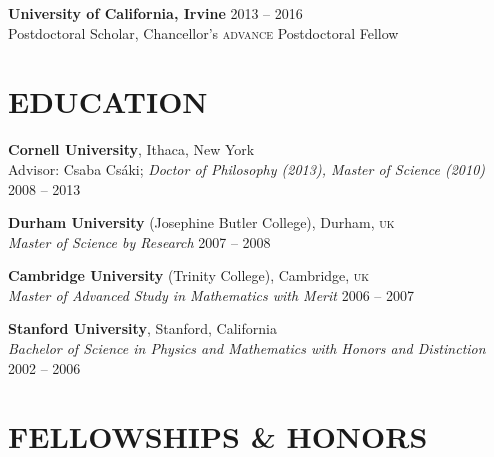 \documentclass[margin,line]{resume}
\newcommand{\scap}[1]{\textsc{\MakeLowercase{#1}}}
\begin{document}
\begin{resume}
\vspace{-3mm}


\textbf{University of California, Irvine} 
\hfill 
\textsf{ 
2013 -- 2016
}\vspace{-3mm}\\

\vspace{-6mm}
Postdoctoral Scholar, Chancellor's \textsc{advance} Postdoctoral Fellow   







\section{\footnotesize \sc
\sffamily 
{}
EDUCATION
}

\textbf{Cornell University}, Ithaca, New York \\
Advisor: Csaba Cs\'aki; 
\textsl{Doctor of Philosophy (2013), Master of Science (2010)} 
\hfill 
\textsf{ 2008 -- 2013 }

\vspace{-3mm}

\textbf{Durham University} (Josephine Butler College), Durham, \scap{UK} \\
\textsl{Master of Science by Research} 
\hfill 
\textsf{ 2007 -- 2008 }

\vspace{-3mm}

\textbf{Cambridge University} (Trinity College), Cambridge, \scap{UK} \\
\textsl{Master of Advanced Study in Mathematics with Merit} 
\hfill 
\textsf{ 2006 -- 2007 }

\vspace{-3mm}

\textbf{Stanford University}, Stanford, California \\
\textsl{Bachelor of Science in Physics and Mathematics with Honors and Distinction} 
\hfill 
\textsf{ 2002 -- 2006 }









\section{\footnotesize \sc
\sffamily 
{}
FELLOWSHIPS \& HONORS
}


\end{resume}
\end{document}

